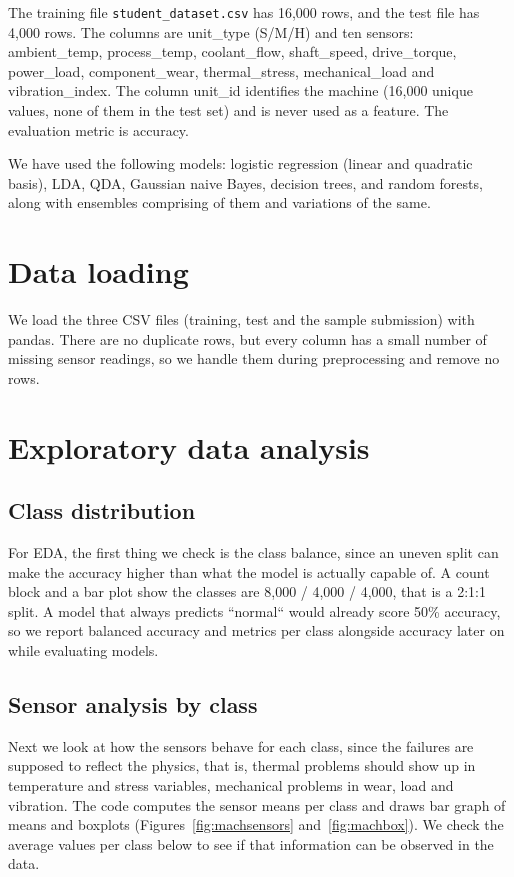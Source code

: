 \documentclass[11pt]{article}
\begin{document}
The training file \texttt{student\_dataset.csv} has 16,000 rows, and the test file has 4,000 rows. The columns are unit\_type (S/M/H) and ten sensors: ambient\_temp, process\_temp, coolant\_flow, shaft\_speed, drive\_torque, power\_load, component\_wear, thermal\_stress, mechanical\_load and vibration\_index. The column unit\_id identifies the machine (16,000 unique values, none of them in the test set) and is never used as a feature. The evaluation metric is accuracy.

We have used the following models: logistic regression (linear and quadratic basis), LDA, QDA, Gaussian naive Bayes, decision trees, and random forests, along with ensembles comprising of them and variations of the same.

\section{Data loading}

We load the three CSV files (training, test and the sample submission) with pandas. There are no duplicate rows, but every column has a small number of missing sensor readings, so we handle them during preprocessing and remove no rows.

\section{Exploratory data analysis}
\subsection{Class distribution}

For EDA, the first thing we check is the class balance, since an uneven split can make the accuracy higher than what the model is actually capable of. A count block and a bar plot show the classes are 8,000 / 4,000 / 4,000, that is a 2:1:1 split. A model that always predicts ``normal`` would already score 50\% accuracy, so we report balanced accuracy and metrics per class alongside accuracy later on while evaluating models.

\subsection{Sensor analysis by class}

Next we look at how the sensors behave for each class, since the failures are supposed to reflect the physics, that is, thermal problems should show up in temperature and stress variables, mechanical problems in wear, load and vibration. The code computes the sensor means per class and draws bar graph of means and boxplots (Figures~\ref{fig:machsensors} and~\ref{fig:machbox}). We check the average values per class below to see if that information can be observed in the data.
\end{document}
